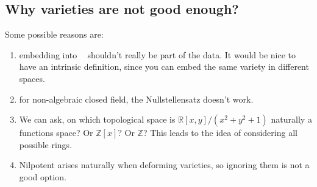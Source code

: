 \documentclass[12pt]{article} %
\DeclareMathOperator{\Aff}{\mathbb{A}^n}
\begin{document}
\subsection{Why varieties are not good enough?}
Some possible reasons are:
\begin{enumerate}
      \item embedding into $\Aff$ shouldn't really be part of the data. It would be nice
            to have an intrinsic definition, since you can embed the same variety in different spaces.
      \item for non-algebraic closed field, the Nullstellensatz doesn't work.
      \item We can ask, on which topological space is $\mathbb{R}[x,y]/(x^2+y^2+1)$ naturally a functions space? Or $\mathbb{Z}[x]$? Or $\mathbb{Z}$?
            This leads to the idea of considering all possible rings.
      \item Nilpotent arises naturally when deforming varieties, so ignoring them is not a good option.
\end{enumerate}
\newpage
\end{document}
